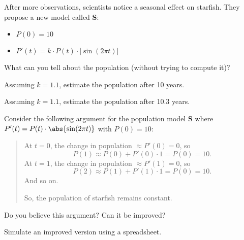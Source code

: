 \documentclass{workbook}
\begin{document}
\begin{slide}
	\question
	After more observations, scientists notice a seasonal effect on starfish. They propose a new model called \textbf{S}:
	\begin{itemize}
		\item $P(0)=10$
		\item $P'(t) = k\cdot P(t)\cdot |\sin(2\pi t)|$
	\end{itemize}
	
	\begin{parts}
		\item What can you tell about the population (without trying to compute it)?
		\item Assuming $k=1.1$, estimate the population after 10 years.
		\item Assuming $k=1.1$, estimate the population after 10.3 years.
	\end{parts}
\end{slide}

\begin{slide}
	\question
	Consider the following argument for the population model \textbf{S} where
	$P'(t)=P(t)\cdot\abs{\sin(2\pi t)}$ with $P(0)=10$:
	\begin{quote}
		\color{blue}
		At $t=0$, the change in population $\approx P'(0)=0$, so
		\[
			P(1) \approx P(0)+P'(0)\cdot 1 = P(0)=10.
		\]
		At $t=1$, the change in population $\approx P'(1)=0$, so
		\[
			P(2) \approx P(1)+P'(1)\cdot 1 = P(0)=10.
		\]
		And so on.

		So, the population of starfish remains constant.
	\end{quote}
	
	\begin{parts}
		\item Do you believe this argument? Can it be improved?
		\item Simulate an improved version using a spreadsheet.
	\end{parts}
	\vspace*{1.5in}
\end{slide}
\end{document}
